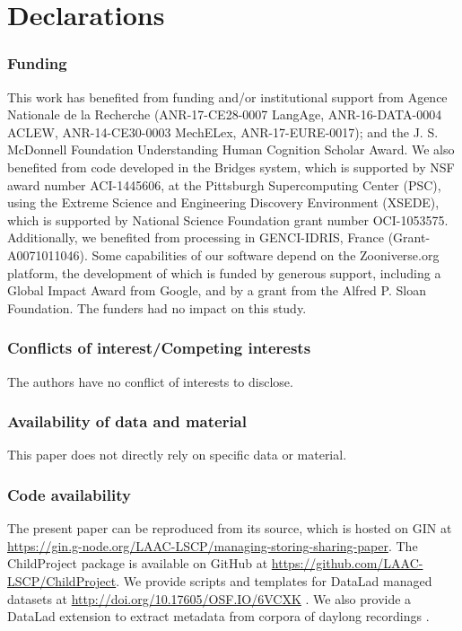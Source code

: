 \documentclass[smallextended]{svjour3}       %
\begin{document}
\section*{Declarations}

\subsubsection*{Funding} 
This work has benefited from funding and/or institutional support from Agence Nationale de la Recherche (ANR-17-CE28-0007 LangAge,
ANR-16-DATA-0004 ACLEW, ANR-14-CE30-0003 MechELex, ANR-17-EURE-0017);
and the J. S. McDonnell Foundation Understanding Human Cognition Scholar Award. We also benefited from code developed in the Bridges system, which is
supported by NSF award number ACI-1445606, at the Pittsburgh
Supercomputing Center (PSC), using the Extreme Science and Engineering Discovery Environment
(XSEDE), which is supported by National Science Foundation grant number OCI-1053575. Additionally, we benefited from processing in GENCI-IDRIS, France (Grant-A0071011046). Some capabilities of our software depend on  the Zooniverse.org platform, the development of which is funded by generous support, including a Global Impact Award from Google, and by a grant from the Alfred P. Sloan Foundation. The funders had no impact on this study.

\subsubsection*{Conflicts of interest/Competing interests}

The authors have no conflict of interests to disclose.

\subsubsection*{Availability of data and material}

This paper does not directly rely on specific data or material.

\subsubsection*{Code availability}

The present paper can be reproduced from its source, which is hosted on GIN at \url{https://gin.g-node.org/LAAC-LSCP/managing-storing-sharing-paper}.
The ChildProject package is available on GitHub at \url{https://github.com/LAAC-LSCP/ChildProject}. We provide scripts and templates for DataLad managed datasets at \url{http://doi.org/10.17605/OSF.IO/6VCXK} \citep{datalad_procedures}. We also provide a DataLad extension to extract metadata from corpora of daylong recordings \citep{datalad_extension}.
\end{document}

